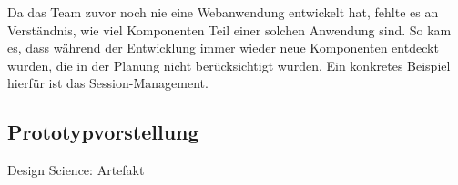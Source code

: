 Da das Team zuvor noch nie eine Webanwendung entwickelt hat, fehlte es an Verständnis, wie viel Komponenten Teil einer solchen Anwendung sind.
So kam es, dass während der Entwicklung immer wieder neue Komponenten entdeckt wurden, die in der Planung nicht berücksichtigt wurden.
Ein konkretes Beispiel hierfür ist das Session-Management.


\subsection{Prototypvorstellung}\label{subsec:Prototyp}
Design Science: Artefakt